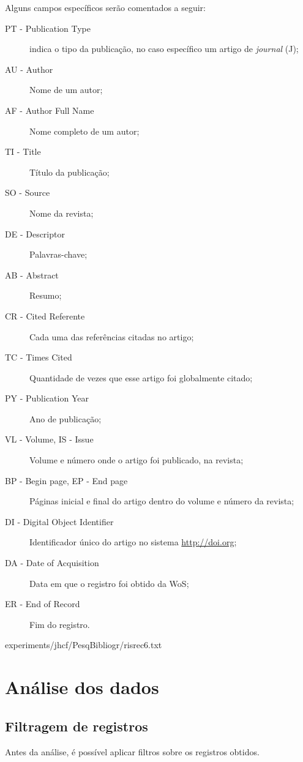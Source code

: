 Alguns campos específicos serão comentados a seguir:
\begin{description}
    \item [PT - Publication Type] indica o tipo da publicação, no caso específico um artigo de \textit{journal} (J);
    \item [AU - Author] Nome de um autor;
    \item [AF - Author Full Name] Nome completo de um autor;
    \item [TI - Title] Título da publicação;
    \item [SO - Source] Nome da revista;
    \item [DE - Descriptor] Palavras-chave;
    \item [AB - Abstract] Resumo;
    \item [CR - Cited Referente] Cada uma das referências citadas no artigo;
    \item [TC - Times Cited] Quantidade de vezes que esse artigo foi globalmente citado;
    \item [PY - Publication Year] Ano de publicação;
    \item [VL - Volume, IS - Issue] Volume e número onde o artigo foi publicado, na revista;
    \item [BP - Begin page, EP - End page] Páginas inicial e final do artigo dentro do volume e número da revista;
    \item [DI - Digital Object Identifier] Identificador único do artigo no sistema \url{http://doi.org};
    \item [DA - Date of Acquisition] Data em que o registro foi obtido da WoS;
    \item [ER - End of Record] Fim do registro.
\end{description}


{experiments/jhcf/PesqBibliogr/risrec6.txt}

\section{Análise dos dados}

\subsection{Filtragem de registros}
Antes da análise, é possível aplicar filtros sobre os registros obtidos.

